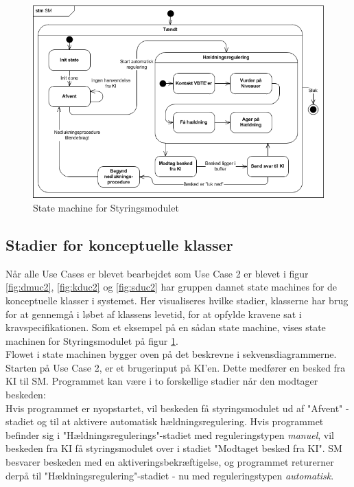 \begin{figure}[htbp]
\centering
\includegraphics[scale=0.8]{billeder/Systemarkitektur/stm_sm}
\caption{State machine for Styringsmodulet}
\label{fig:stm_sm}
\end{figure}

\subsection{Stadier for konceptuelle klasser}
Når alle Use Cases er blevet bearbejdet som Use Case 2 er blevet i figur \ref{fig:dmuc2}, \ref{fig:kduc2} og \ref{fig:sduc2} har gruppen dannet state machines for de konceptuelle klasser i systemet. Her visualiseres hvilke stadier, klasserne har brug for at gennemgå i løbet af klassens levetid, for at opfylde kravene sat i kravspecifikationen. Som et eksempel på en sådan state machine, vises state machinen for Styringsmodulet på figur \ref{fig:stm_sm}. \\Flowet i state machinen bygger oven på det beskrevne i sekvensdiagrammerne. Starten på Use Case 2, er et brugerinput på KI'en. Dette medfører en besked fra KI til SM. Programmet kan være i to forskellige stadier når den modtager beskeden:\\
Hvis programmet er nyopstartet, vil beskeden få styringsmodulet ud af "Afvent" -stadiet og til at aktivere automatisk hældningsregulering. Hvis programmet befinder sig i "Hældningsregulerings"-stadiet med reguleringstypen \textit{manuel}, vil beskeden fra KI få styringsmodulet over i stadiet "Modtaget besked fra KI". SM besvarer beskeden med en aktiveringsbekræftigelse, og programmet returerner derpå til "Hældningsregulering"-stadiet - nu med reguleringstypen \textit{automatisk}.

